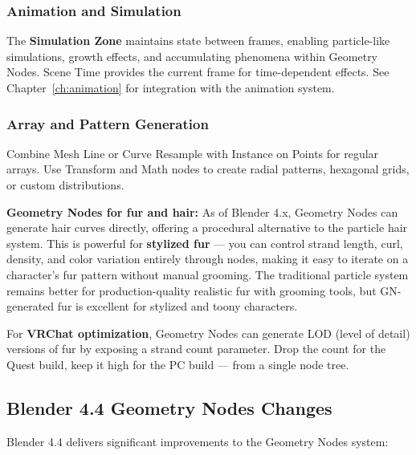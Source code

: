 \subsubsection{Animation and Simulation}

The \textbf{Simulation Zone} maintains state between frames, enabling particle-like simulations, growth effects, and accumulating phenomena within Geometry Nodes. Scene Time provides the current frame for time-dependent effects. See Chapter~\ref{ch:animation} for integration with the animation system.

\subsubsection{Array and Pattern Generation}

Combine Mesh Line or Curve Resample with Instance on Points for regular arrays. Use Transform and Math nodes to create radial patterns, hexagonal grids, or custom distributions.

\begin{furrybox}
\textbf{Geometry Nodes for fur and hair:} As of Blender 4.x, Geometry Nodes can generate hair curves directly, offering a procedural alternative to the particle hair system. This is powerful for \textbf{stylized fur} --- you can control strand length, curl, density, and color variation entirely through nodes, making it easy to iterate on a character's fur pattern without manual grooming. The traditional particle system remains better for production-quality realistic fur with grooming tools, but GN-generated fur is excellent for stylized and toony characters.

For \textbf{VRChat optimization}, Geometry Nodes can generate LOD (level of detail) versions of fur by exposing a strand count parameter. Drop the count for the Quest build, keep it high for the PC build --- from a single node tree.
\end{furrybox}

\subsection{Blender 4.4 Geometry Nodes Changes}
\label{sec:gn44}

Blender 4.4 delivers significant improvements to the Geometry Nodes system:

